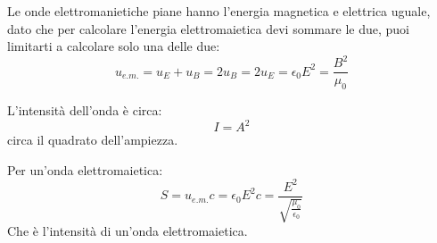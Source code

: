 Le onde elettromanietiche piane hanno l'energia magnetica e elettrica uguale,
dato che per calcolare l'energia elettromaietica devi sommare le due,
puoi limitarti a calcolare solo una delle due:
\begin{equation}
    u_{e.m.} = u_E + u_B = 2u_B = 2u_E = \epsilon_0E^2 = 
    \frac{B^2}{\mu_0}
\end{equation}

L'intensità dell'onda è circa:
\begin{equation}
    I = A^2
\end{equation}
circa il quadrato dell'ampiezza.

Per un'onda elettromaietica:
\begin{equation}
    S = u_{e.m.}c = \epsilon_0E^2c = \frac{E^2}
    {\sqrt{\frac{\mu_0}{\epsilon_0}}}
\end{equation}
Che è l'intensità di un'onda elettromaietica.

